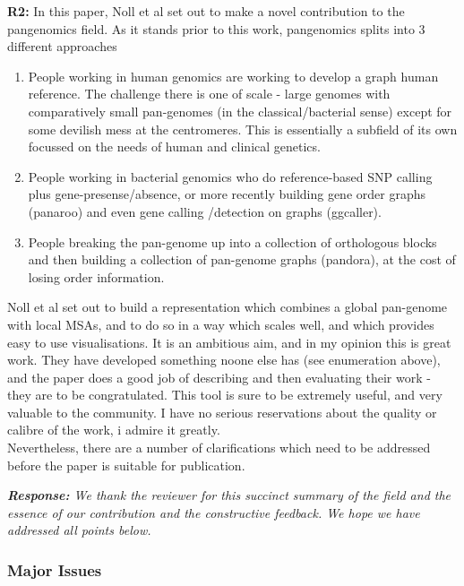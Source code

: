 \documentclass[aps,rmp,onecolumn]{revtex4-1}
\newcommand{\reviewer}[2]{\textbf{#1:} #2\vskip 5mm}
\newcommand{\response}[1]{{\it {\color{response}\textbf{Response:} #1}}\vskip 5mm}
\begin{document}
\reviewer{R2}{In this paper, Noll et al set out to make a novel contribution to the pangenomics field. As it stands prior to this work, pangenomics splits into 3 different approaches

      \begin{enumerate}
            \item People working in human genomics are working to develop a graph human reference. The challenge there is one of scale - large genomes with comparatively small pan-genomes (in the classical/bacterial sense) except for some devilish mess at the centromeres. This is essentially a subfield of its own focussed on the needs of human and clinical genetics.

            \item People working in bacterial genomics who do reference-based SNP calling plus gene-presense/absence, or more recently building gene order graphs (panaroo) and even gene calling /detection on graphs (ggcaller).

            \item People breaking the pan-genome up into a collection of orthologous blocks and then building a collection of pan-genome graphs (pandora), at the cost of losing order information.
      \end{enumerate}


      Noll et al set out to build a representation which combines a global pan-genome with local MSAs, and to do so in a way which scales well, and which provides easy to use visualisations. It is an ambitious aim, and in my opinion this is great work. They have developed something noone else has (see enumeration above), and the paper does a good job of describing and then evaluating their work - they are to be congratulated. This tool is sure to be extremely useful, and very valuable to the community. I have no serious reservations about the quality or calibre of the work, i admire it greatly.\\

      Nevertheless, there are a number of clarifications which need to be addressed before the paper is suitable for publication.}

\response{We thank the reviewer for this succinct summary of the field and the essence of our contribution and the constructive feedback. We hope we have addressed all points below. }

\subsubsection*{Major Issues}
\end{document}
